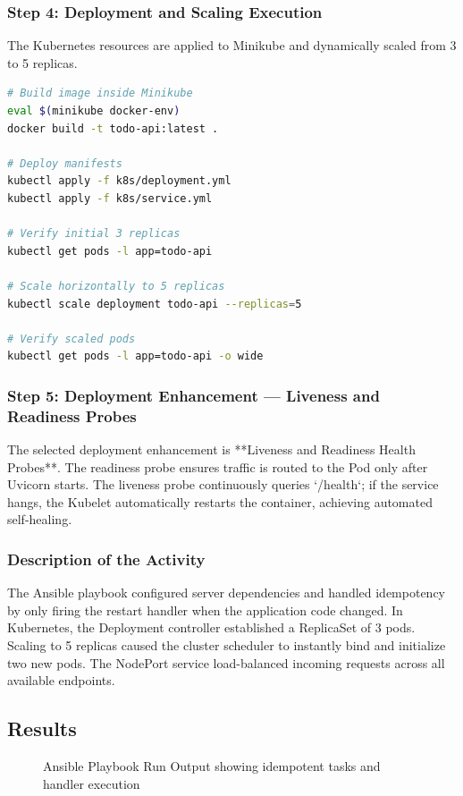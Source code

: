 \documentclass[12pt,a4paper]{article}
\begin{document}
\subsubsection*{Step 4: Deployment and Scaling Execution}
The Kubernetes resources are applied to Minikube and dynamically scaled from 3 to 5 replicas.

\begin{lstlisting}[language=bash]
# Build image inside Minikube
eval $(minikube docker-env)
docker build -t todo-api:latest .

# Deploy manifests
kubectl apply -f k8s/deployment.yml
kubectl apply -f k8s/service.yml

# Verify initial 3 replicas
kubectl get pods -l app=todo-api

# Scale horizontally to 5 replicas
kubectl scale deployment todo-api --replicas=5

# Verify scaled pods
kubectl get pods -l app=todo-api -o wide
\end{lstlisting}

\subsubsection*{Step 5: Deployment Enhancement --- Liveness and Readiness Probes}
The selected deployment enhancement is **Liveness and Readiness Health Probes**. The readiness probe ensures traffic is routed to the Pod only after Uvicorn starts. The liveness probe continuously queries `/health`; if the service hangs, the Kubelet automatically restarts the container, achieving automated self-healing.

\subsubsection*{Description of the Activity}
The Ansible playbook configured server dependencies and handled idempotency by only firing the restart handler when the application code changed. In Kubernetes, the Deployment controller established a ReplicaSet of 3 pods. Scaling to 5 replicas caused the cluster scheduler to instantly bind and initialize two new pods. The NodePort service load-balanced incoming requests across all available endpoints.

\subsection*{Results}

\begin{figure}[htbp]
\centering
\caption{Ansible Playbook Run Output showing idempotent tasks and handler execution}
\end{figure}
\end{document}
